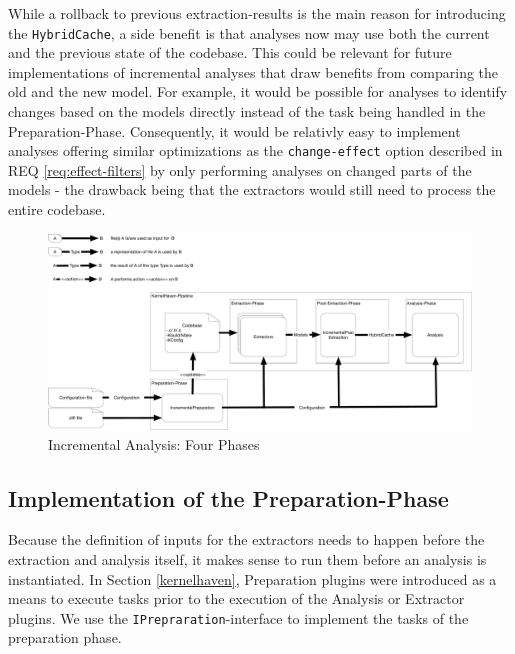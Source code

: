 \documentclass[a4paper]{article}
\begin{document}
While a rollback to previous extraction-results is the main reason for introducing the \texttt{Hybrid\-Cache}, a side benefit is that analyses now may use both the current and the previous state of the codebase. This could be relevant for future implementations of incremental analyses that draw benefits from comparing the old and the new model. For example, it would be possible for analyses to identify changes based on the models directly instead of the task being handled in the Preparation-Phase. Consequently, it would be relativly easy to implement analyses offering similar optimizations as the \texttt{change-effect} option described in REQ \ref{req:effect-filters} by only performing analyses on changed parts of the models - the drawback being that the extractors would still need to process the entire codebase.

\clearpage
\begin{figure}[h] 
  \centering
  \begin{minipage}[b]{1\textwidth} 
    \caption[Incremental Analysis: Four Phases]{Incremental Analysis: Four Phases}\label{4-phases}
    \centering
    \includegraphics[width=1.0\textheight, angle=90]{img/KernelHavenIncremental.pdf}
  \end{minipage}
\end{figure}
\clearpage


\subsection{Implementation of the Preparation-Phase}\label{preparation-phase}

Because the definition of inputs for the extractors needs to happen before the extraction and analysis itself, it makes sense to run them before an analysis is instantiated. In Section \ref{kernelhaven}, Preparation plugins were introduced as a means to execute tasks prior to the execution of the Analysis or Extractor plugins. We use the \texttt{IPrepraration}-interface to implement the tasks of the preparation phase.
\end{document}
